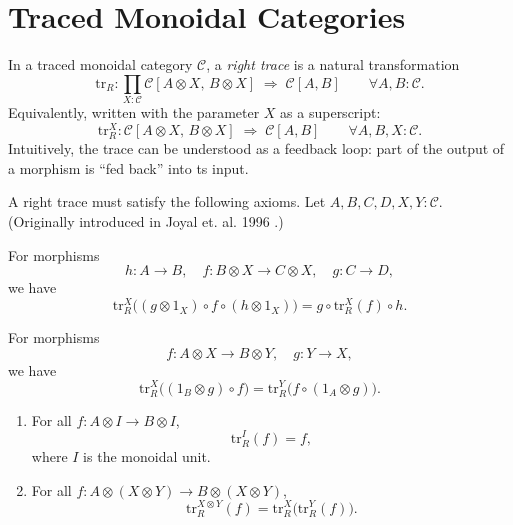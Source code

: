 \section{Traced Monoidal Categories} 
\begin{definition}
        \label{def:trace}
	In a traced monoidal category $\mathcal{C}$, a \emph{right trace} is a natural transformation
	$$
		\mathrm{tr}_{R} : \prod_{X : \mathcal{C}} \mathcal{C}[A \otimes X,\, B \otimes X]
		\;\Rightarrow\; \mathcal{C}[A,B]
		\qquad \forall A,B : \mathcal{C}.
	$$
	Equivalently, written with the parameter $X$ as a superscript:
	$$
		\mathrm{tr}_{R}^{X} : \mathcal{C}[A \otimes X,\, B \otimes X]
		\;\Rightarrow\; \mathcal{C}[A,B]
		\qquad \forall A,B,X : \mathcal{C}.
	$$
	Intuitively, the trace can be understood as a feedback loop: part of the output of a morphism is ``fed back'' into ts input.
\end{definition}
A right trace must satisfy the following axioms.
Let $A,B,C,D,X,Y : \mathcal{C}$. (Originally introduced in Joyal et. al. 1996 \cite{joyal1996-traced-monoidal-categories}.) 
\begin{axiom}[Tightening]
        \label{axiom:tightening}
	For morphisms
	$$
		h : A \to B,
		\quad f : B \otimes X \to C \otimes X,
		\quad g : C \to D,
	$$
	we have
	$$
		\mathrm{tr}_{R}^{X}\!\big( (g \otimes 1_X) \circ f \circ (h \otimes 1_X) \big)
		= g \circ \mathrm{tr}_{R}^{X}(f) \circ h.
	$$
\end{axiom}
\begin{axiom}[Sliding]
        \label{axiom:sliding}
	For morphisms
	$$
		f : A \otimes X \to B \otimes Y,
		\quad g : Y \to X,
	$$
	we have
	$$
		\mathrm{tr}_{R}^{X}\!\big( (1_B \otimes g) \circ f \big)
		= \mathrm{tr}_{R}^{Y}\!\big( f \circ (1_A \otimes g) \big).
	$$
\end{axiom}
\begin{axiom}[Vanishing]
        \label{axiom:vanishing}
	\begin{enumerate}
		\item For all $f : A \otimes I \to B \otimes I$,
		      $$
			      \mathrm{tr}_{R}^{I}(f) = f,
		      $$
		      where $I$ is the monoidal unit.
		\item For all $f : A \otimes (X \otimes Y) \to B \otimes (X \otimes Y)$,
		      $$
			      \mathrm{tr}_{R}^{X \otimes Y}(f)
			      = \mathrm{tr}_{R}^{X}\!\big( \mathrm{tr}_{R}^{Y}(f) \big).
		      $$
	\end{enumerate}
\end{axiom}
